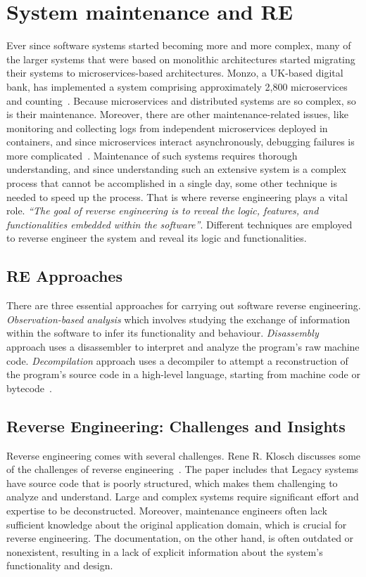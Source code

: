 \newpage
\section{System maintenance and RE}

Ever since software systems started becoming more and more complex, many of the larger systems that were based on monolithic architectures started migrating their systems to microservices-based architectures. Monzo, a UK-based digital bank, has implemented a system comprising approximately 2,800 microservices and counting~\citep{monzoMicroservices}. Because microservices and distributed systems are so complex, so is their maintenance. Moreover, there are other maintenance-related issues, like monitoring and collecting logs from independent microservices deployed in containers, and since microservices interact asynchronously, debugging failures is more complicated~\citep{Waseem_2021}. Maintenance of such systems requires thorough understanding, and since understanding such an extensive system is a complex process that cannot be accomplished in a single day, some other technique is needed to speed up the process. That is where reverse engineering plays a vital role. \textit{``The goal of reverse engineering is to reveal the logic, features, and functionalities embedded within the software''}\citep{digitalai_reverse_engineering}. Different techniques are employed to reverse engineer the system and reveal its logic and functionalities.

\subsection{RE Approaches}
\sloppy
There are three essential approaches for carrying out software reverse engineering. \textit{Observation-based analysis} which involves studying the exchange of information within the software to infer its functionality and behaviour. \textit{Disassembly} approach uses a disassembler to interpret and analyze the program's raw machine code. \textit{Decompilation} approach uses a decompiler to attempt a reconstruction of the program's source code in a high-level language, starting from machine code or bytecode~\citep{twoFacesOfSRE}.

\subsection{Reverse Engineering: Challenges and Insights}
Reverse engineering comes with several challenges. Rene R. Klosch discusses some of the challenges of reverse engineering~\citep{klosch1996reverse}. The paper includes that Legacy systems have source code that is poorly structured, which makes them challenging to analyze and understand. Large and complex systems require significant effort and expertise to be deconstructed. Moreover, maintenance engineers often lack sufficient knowledge about the original application domain, which is crucial for reverse engineering. The documentation, on the other hand, is often outdated or nonexistent, resulting in a lack of explicit information about the system's functionality and design.

